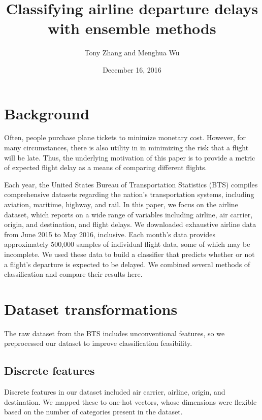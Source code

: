 \documentclass{article}
\title{Classifying airline departure delays with ensemble methods}
\author{Tony Zhang and Menghua Wu}
\date{December 16, 2016}
\begin{document}
\maketitle

\begin{multicols}{2}


\section{Background}
\label{sec:bg}

Often, people purchase plane tickets
to minimize monetary cost.
However, for many circumstances,
there is also utility in
in minimizing the risk that a flight will be late.
Thus, the underlying motivation of this paper
is to provide a metric of expected flight delay
as a means of comparing different flights.

Each year,
the United States Bureau of Transportation Statistics (BTS)
compiles comprehensive datasets
regarding the nation's transportation systems,
including aviation, maritime, highway, and rail.
In this paper, we focus on the airline dataset,
which reports on a wide range of variables including
airline, air carrier, origin, and destination, and flight delays.
We downloaded exhaustive airline data
from June 2015 to May 2016, inclusive.
Each month's data provides
approximately 500,000 samples of individual flight data,
some of which may be incomplete.
We used these data to build a classifier
that predicts whether or not a flight's departure
is expected to be delayed.
We combined several methods of classification
and compare their results here.

\section{Dataset transformations}
\label{sec:dataset}

The raw dataset from the BTS
includes unconventional features,
so we preprocessed our dataset
to improve classification feasibility.

\subsection{Discrete features}

Discrete features in our dataset included
air carrier, airline, origin, and destination.
We mapped these to one-hot vectors,
whose dimensions were flexible based on
the number of categories present in the dataset.


\end{multicols}
\end{document}
